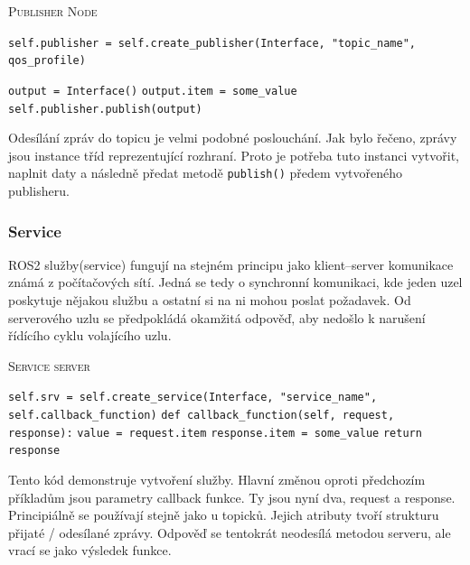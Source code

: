 \begin{algorithm}[h!]
	\label{}
	\caption{\textsc{Publisher Node}}
	
	\DontPrintSemicolon
	\SetAlgoNoLine
	\SetNlSty{}{}{:}
	\SetNlSkip{-1.1em}
	
	\BlankLine \Indp\Indpp
	\texttt{self.publisher = self.create\_publisher(Interface, "topic\_name", qos\_profile)}\;
	
	\BlankLine
	\texttt{output = Interface()}\;
	\texttt{output.item = some\_value}\;
	\texttt{self.publisher.publish(output)}\;
\end{algorithm}
Odesílání zpráv do topicu je velmi podobné poslouchání. Jak bylo řečeno, zprávy jsou instance tříd reprezentující rozhraní. Proto je potřeba tuto instanci vytvořit, naplnit daty a následně předat metodě \verb|publish()| předem vytvořeného publisheru. \cite{ros2_documentation}

\subsubsection*{Service}
ROS2 služby(service) fungují na stejném principu jako klient--server komunikace známá z počítačových sítí. Jedná se tedy o synchronní komunikaci, kde jeden uzel poskytuje nějakou službu a ostatní si na ni mohou poslat požadavek. Od serverového uzlu se předpokládá okamžitá odpověď, aby nedošlo k narušení řídícího cyklu volajícího uzlu. \cite[str:~6]{ros2_introduction}

\begin{algorithm}[h!]
	\label{}
	\caption{\textsc{Service server}}
	
	\DontPrintSemicolon
	\SetAlgoNoLine
	\SetAlgoNlRelativeSize{-1}
	\SetNlSty{}{}{:}
	\SetNlSkip{-1.1em}
	
	\BlankLine \Indp\Indpp
	
	\texttt{self.srv = self.create\_service(Interface, "service\_name", self.callback\_function)}\;
	\BlankLine
	\texttt{def callback\_function(self, request, response):}\;
	\Indp\Indp
	\texttt{value = request.item}\;
	\texttt{response.item = some\_value}\;
	\texttt{return response}\;
	
\end{algorithm}
Tento kód demonstruje vytvoření služby. Hlavní změnou oproti předchozím příkladům jsou parametry callback funkce. Ty jsou nyní dva, request a response. Principiálně se používají stejně jako u topicků. Jejich atributy tvoří strukturu přijaté / odesílané zprávy. Odpověď se tentokrát neodesílá metodou serveru, ale vrací se jako výsledek funkce. \cite{ros2_documentation}

